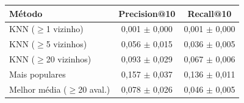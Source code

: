 \begin{tabular}{lcc}
\hline
M\'etodo & Precision@10 & Recall@10 \\
\hline
KNN ($\geq$1 vizinho) & 0,001 $\pm$ 0,000 & 0,001 $\pm$ 0,000 \\
KNN ($\geq$5 vizinhos) & 0,056 $\pm$ 0,015 & 0,036 $\pm$ 0,005 \\
KNN ($\geq$20 vizinhos) & 0,093 $\pm$ 0,029 & 0,067 $\pm$ 0,006 \\
Mais populares & 0,157 $\pm$ 0,037 & 0,136 $\pm$ 0,011 \\
Melhor m\'edia ($\geq$20 aval.) & 0,078 $\pm$ 0,026 & 0,046 $\pm$ 0,005 \\
\hline
\end{tabular}
